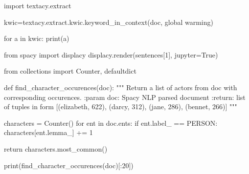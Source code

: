 \documentclass[
  letterpaper,
  DIV=11,
  numbers=noendperiod]{scrreprt}
\newenvironment{Shaded}{\begin{snugshade}}{\end{snugshade}}
\newcommand{\BuiltInTok}[1]{\textcolor[rgb]{0.00,0.23,0.31}{#1}}
\newcommand{\CommentTok}[1]{\textcolor[rgb]{0.37,0.37,0.37}{#1}}
\newcommand{\ControlFlowTok}[1]{\textcolor[rgb]{0.00,0.23,0.31}{#1}}
\newcommand{\DecValTok}[1]{\textcolor[rgb]{0.68,0.00,0.00}{#1}}
\newcommand{\ImportTok}[1]{\textcolor[rgb]{0.00,0.46,0.62}{#1}}
\newcommand{\KeywordTok}[1]{\textcolor[rgb]{0.00,0.23,0.31}{#1}}
\newcommand{\NormalTok}[1]{\textcolor[rgb]{0.00,0.23,0.31}{#1}}
\newcommand{\OperatorTok}[1]{\textcolor[rgb]{0.37,0.37,0.37}{#1}}
\newcommand{\StringTok}[1]{\textcolor[rgb]{0.13,0.47,0.30}{#1}}
\newcommand{\VariableTok}[1]{\textcolor[rgb]{0.07,0.07,0.07}{#1}}
\begin{document}
\begin{Shaded}
\begin{Highlighting}[]
\ImportTok{import}\NormalTok{ textacy.extract}

\NormalTok{kwic}\OperatorTok{=}\NormalTok{textacy.extract.kwic.keyword\_in\_context(doc, }\StringTok{\textquotesingle{}global warming\textquotesingle{}}\NormalTok{)}

\ControlFlowTok{for}\NormalTok{ a }\KeywordTok{in}\NormalTok{ kwic:}
  \BuiltInTok{print}\NormalTok{(a)}
\end{Highlighting}
\end{Shaded}

\begin{Shaded}
\begin{Highlighting}[]
\ImportTok{from}\NormalTok{ spacy }\ImportTok{import}\NormalTok{ displacy}
\NormalTok{displacy.render(sentences[}\DecValTok{1}\NormalTok{], jupyter}\OperatorTok{=}\VariableTok{True}\NormalTok{)}
\end{Highlighting}
\end{Shaded}

\begin{Shaded}
\begin{Highlighting}[]
\ImportTok{from}\NormalTok{ collections }\ImportTok{import}\NormalTok{ Counter, defaultdict}

\KeywordTok{def}\NormalTok{ find\_character\_occurences(doc):}
    \CommentTok{"""}
\CommentTok{    Return a list of actors from \textasciigrave{}doc\textasciigrave{} with corresponding occurences.}
\CommentTok{    }
\CommentTok{    :param doc: Spacy NLP parsed document}
\CommentTok{    :return: list of tuples in form}
\CommentTok{        [(\textquotesingle{}elizabeth\textquotesingle{}, 622), (\textquotesingle{}darcy\textquotesingle{}, 312), (\textquotesingle{}jane\textquotesingle{}, 286), (\textquotesingle{}bennet\textquotesingle{}, 266)]}
\CommentTok{    """}
    
\NormalTok{    characters }\OperatorTok{=}\NormalTok{ Counter()}
    \ControlFlowTok{for}\NormalTok{ ent }\KeywordTok{in}\NormalTok{ doc.ents:}
        \ControlFlowTok{if}\NormalTok{ ent.label\_ }\OperatorTok{==} \StringTok{\textquotesingle{}PERSON\textquotesingle{}}\NormalTok{:}
\NormalTok{            characters[ent.lemma\_] }\OperatorTok{+=} \DecValTok{1}
            
    \ControlFlowTok{return}\NormalTok{ characters.most\_common()}

\BuiltInTok{print}\NormalTok{(find\_character\_occurences(doc)[:}\DecValTok{20}\NormalTok{])}
\end{Highlighting}
\end{Shaded}
\end{document}
